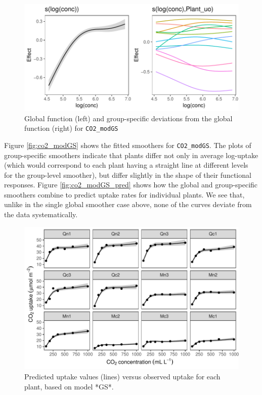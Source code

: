 \documentclass[12pt]{article}
\begin{document}
\begin{figure}
\includegraphics[width=\linewidth]{../figures/co2_modGS_plot-1} \caption{\label{fig:co2_modGS}Global function (left) and group-specific deviations from the global function (right) for \texttt{CO2\_modGS}}\label{fig:co2_modGS_plot}
\end{figure}

Figure \ref{fig:co2_modGS} shows the fitted smoothers for
\texttt{CO2\_modGS}. The plots of group-specific smoothers indicate that
plants differ not only in average log-uptake (which would correspond to
each plant having a straight line at different levels for the
group-level smoother), but differ slightly in the shape of their
functional responses. Figure \ref{fig:co2_modGS_pred} shows how the
global and group-specific smoothers combine to predict uptake rates for
individual plants. We see that, unlike in the single global smoother
case above, none of the curves deviate from the data systematically.

\begin{figure}
\includegraphics[width=\linewidth]{../figures/co2_modGS_ggplot-1} \caption{\label{fig:co2_modGS_pred}Predicted uptake values (lines) versus observed uptake for each plant, based on model *GS*.}\label{fig:co2_modGS_ggplot}
\end{figure}
\end{document}
